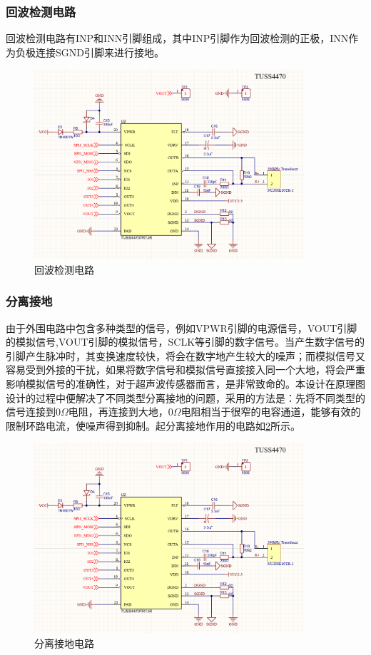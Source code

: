     \subsubsection{回波检测电路}
    回波检测电路有INP和INN引脚组成，其中INP引脚作为回波检测的正极，INN作为负极连接SGND引脚来进行接地。
     \begin{figure}[H]
    	\centering
    	\includegraphics[width=10cm]{figure/TUSS4470 peripheral circuit.png}
    	\songti{}\caption{回波检测电路}
    	\label{回波检测电路}
    \end{figure}
    
    \subsubsection{分离接地}
    由于外围电路中包含多种类型的信号，例如VPWR引脚的电源信号，VOUT引脚的模拟信号,VOUT引脚的模拟信号，SCLK等引脚的数字信号。当产生数字信号的引脚产生脉冲时，其变换速度较快，将会在数字地产生较大的噪声；而模拟信号又容易受到外接的干扰，如果将数字信号和模拟信号直接接入同一个大地，将会严重影响模拟信号的准确性，对于超声波传感器而言，是非常致命的。本设计在原理图设计的过程中便解决了不同类型分离接地的问题，采用的方法是：先将不同类型的信号连接到0$\Omega$电阻，再连接到大地，0$\Omega$电阻相当于很窄的电容通道，能够有效的限制环路电流，使噪声得到抑制。起分离接地作用的电路如\ref{分离接地电路}所示。
     \begin{figure}[H]
        \centering
        \includegraphics[width=10cm]{figure/TUSS4470 peripheral circuit.png}
        \songti{}\caption{分离接地电路}
        \label{分离接地电路}
    \end{figure}
    

